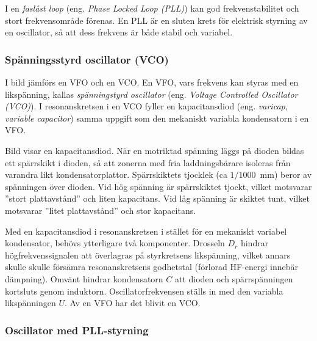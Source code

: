 I en \emph{faslåst loop} (eng. \emph{Phase Locked Loop (PLL)}) kan god
frekvenstabilitet och stort frekvensområde förenas.
En PLL är en sluten krets för elektrisk styrning av en oscillator, så att dess
frekvens är både stabil och variabel.

\subsubsection{Spänningsstyrd oscillator (VCO)}

I bild  jämförs en VFO och en VCO.
En VFO, vars frekvens kan styras med en likspänning, kallas
\emph{spänningstyrd oscillator} (eng. \emph{Voltage Controlled Oscillator
  (VCO)}).
I resonanskretsen i en VCO fyller en kapacitansdiod (eng. \emph{varicap, variable
capacitor}) samma uppgift som den mekaniskt variabla kondensatorn i en VFO.

\newpage
{}

Bild  visar en kapacitansdiod.
När en motriktad spänning läggs på dioden bildas ett spärrskikt i dioden,
så att zonerna med fria laddningsbärare isoleras från varandra likt
kondensatorplattor.
Spärrskiktets tjocklek (ca $1/1000$~\si{\milli\metre}) beror av spänningen över
dioden.
Vid hög spänning är spärrskiktet tjockt, vilket motsvarar
''stort plattavstånd'' och liten kapacitans.
Vid låg spänning är skiktet tunt, vilket motsvarar ''litet plattavstånd'' och
stor kapacitans.

Med en kapacitansdiod i resonanskretsen i stället för en mekaniskt
variabel kondensator, behövs ytterligare två komponenter.
Drosseln \(D_r\) hindrar högfrekvenssignalen att överlagras på styrkretsens
likspänning, vilket annars skulle skulle försämra resonanskretsens godhetstal
(förlorad HF-energi innebär dämpning).
Omvänt hindrar kondensatorn \(C\) att dioden och spärrspänningen kortsluts
genom induktorn.
Oscillatorfrekvensen ställs in med den variabla likspänningen \(U\).
Av en VFO har det blivit en VCO.

\subsubsection{Oscillator med PLL-styrning}

